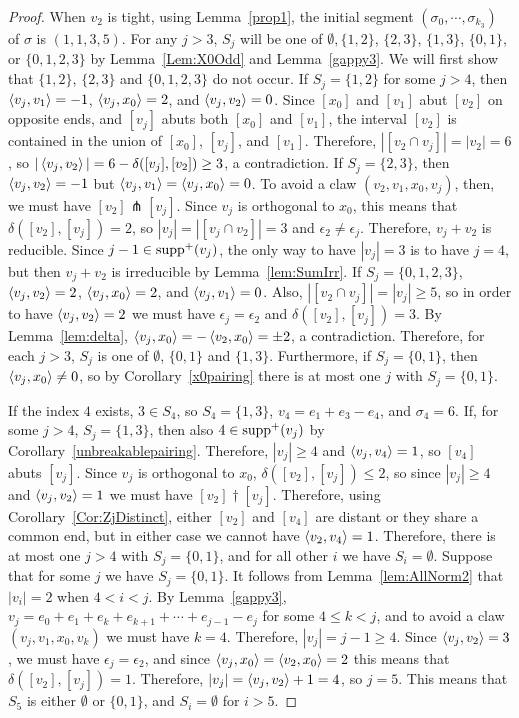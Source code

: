 \begin{proof}
When $v_2$ is tight, using Lemma~\ref{prop1}, the initial segment $(\sigma_0, \cdots, \sigma_{k_3})$ of $\sigma$ is $(1,1,3,5)$. For any $j > 3$, $S_j$ will be one of $\emptyset,\{ 1,2\}$, $\{ 2, 3\}$, $\{ 1,3\}$, $\{0,1\}$, or $\{ 0,1,2,3\}$ by Lemma~\ref{Lem:X0Odd} and Lemma~\ref{gappy3}. We will first show that $\{ 1,2\}$, $\{ 2, 3\}$ and $\{ 0,1,2,3\}$  do not occur. If $S_j = \{1,2\}$ for some $j > 4$, then $\left\langle v_j , v_1 \right\rangle = -1$, $\left\langle v_j , x_0 \right\rangle = 2$, and $\left\langle v_j , v_2 \right\rangle = 0$. Since $[x_0]$ and $[v_1]$ abut $[v_2]$ on opposite ends, and $[v_j]$ abuts both $[x_0]$ and $[v_1]$, the interval $[v_2]$ is contained in the union of $[x_0]$, $[v_j]$, and $[v_1]$. Therefore, $|[v_2 \cap v_j]| =|v_2|= 6$, so $|\left\langle v_j , v_2 \right\rangle| = 6 - \delta([v_j],[v_2]) \ge 3$, a contradiction. If $S_j = \{2,3\}$, then $\left\langle v_j , v_2 \right\rangle = -1$ but $\left\langle v_j , v_1 \right\rangle = \left\langle v_j , x_0 \right\rangle = 0$. To avoid a claw $(v_2,v_1,x_0,v_j)$, then, we must have $[v_2] \pitchfork [v_j]$. Since $v_j$ is orthogonal to $x_0$, this means that $\delta([v_2],[v_j]) = 2$, so $|v_j| = |[v_j\cap v_2]| = 3$ and $\epsilon_2 \neq \epsilon_j$. Therefore, $v_j + v_2$ is reducible. Since $j-1 \in \operatorname{supp}^+(v_j)$, the only way to have $|v_j| = 3$ is to have $j = 4$, but then $v_j + v_2$ is irreducible by Lemma~\ref{lem:SumIrr}. If $S_j = \{0,1,2,3\}$, $\left\langle v_j , v_2 \right\rangle = 2$, $\left\langle v_j , x_0 \right\rangle = 2$, and $\left\langle v_j , v_1 \right\rangle = 0$. Also, $|[v_2 \cap v_j]| = |v_j| \ge 5$, so in order to have $\left\langle v_j , v_2 \right\rangle = 2$ we must have $\epsilon_j = \epsilon_2$ and $\delta([v_2],[v_j]) = 3$. By Lemma~\ref{lem:delta}, $\left\langle v_j , x_0 \right\rangle=-\left\langle v_2 , x_0 \right\rangle=\pm2$, a contradiction. Therefore, for each $j > 3$, $S_j$ is one of $\emptyset$, $\{0,1\}$ and $\{1,3\}$. Furthermore, if $S_j = \{0,1\}$, then $\left\langle v_j , x_0 \right\rangle \neq 0$, so by Corollary~\ref{x0pairing} there is at most one $j$ with $S_j = \{0,1\}$.

If the index $4$ exists, $3 \in S_4$, so $S_4 = \{1,3\}$, $v_4 = e_1 + e_3 - e_4$, and $\sigma_4 = 6$. If, for some $j > 4$, $S_j = \{1,3\}$, then also $4 \in \operatorname{supp}^+(v_j)$ by Corollary~\ref{unbreakablepairing}. Therefore, $|v_j| \ge 4$ and $\left\langle v_j , v_4 \right\rangle = 1$, so $[v_4]$ abuts $[v_j]$. Since $v_j$ is orthogonal to $x_0$, $\delta([v_2],[v_j])\le 2$, so since $|v_j| \ge 4$ and $\left\langle v_j , v_2 \right\rangle = 1$ we must have $[v_2]\dagger [v_j]$. Therefore, using Corollary~\ref{Cor:ZjDistinct}, either $[v_2]$ and $[v_4]$ are distant or they share a common end, but in either case we cannot have $\left\langle v_2 , v_4 \right\rangle = 1$. Therefore, there is at most one $j > 4$ with $S_j = \{0,1\}$, and for all other $i$ we have $S_i = \emptyset$. 
Suppose that for some $j$ we have $S_j = \{0,1\}$. It follows from Lemma~\ref{lem:AllNorm2} that $|v_i|=2$ when $4<i<j$.
By Lemma~\ref{gappy3}, $v_j = e_0 + e_1 + e_k + e_{k+1} + \cdots + e_{j-1} - e_j$ for some $4 \le k < j$, and to avoid a claw $(v_j,v_1,x_0,v_k)$ we must have $k = 4$. Therefore, $|v_j| = j-1 \ge 4$. Since $\left\langle v_j , v_2 \right\rangle = 3$, we must have $\epsilon_j = \epsilon_2$, and since $\left\langle v_j , x_0 \right\rangle=\left\langle v_2 , x_0 \right\rangle=2$ this means that $\delta([v_2],[v_j]) = 1$. Therefore, $|v_j| = \left\langle v_j , v_2 \right\rangle + 1 = 4$, so $j = 5$. This means that $S_5$ is either $\emptyset$ or $\{0,1\}$, and $S_i = \emptyset$ for $i > 5$. 


\end{proof}
